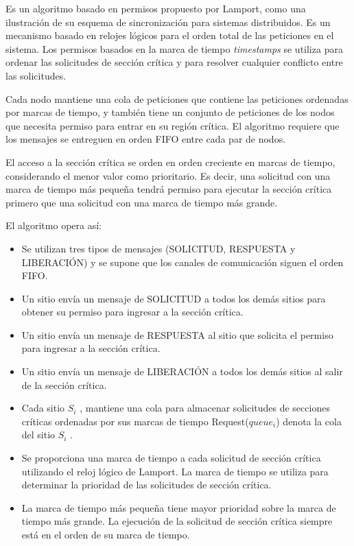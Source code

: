  
 Es un algoritmo basado en permisos propuesto por Lamport, \cite{Lamport1978} como una ilustración de su esquema de sincronización para sistemas distribuidos. Es un  mecanismo basado en relojes lógicos para el orden  total de las peticiones en el sistema.
 Los permisos basados en la marca de tiempo \textit{timestamps} se utiliza para ordenar las solicitudes de sección crítica y para resolver cualquier conflicto entre las solicitudes.
 
 Cada nodo  mantiene una cola de peticiones que contiene las
 peticiones ordenadas por marcas de tiempo, y
 también tiene un conjunto de peticiones de los nodos
 que necesita permiso para entrar en su región crítica.
 El algoritmo requiere que los mensajes se entreguen
 en orden FIFO entre cada par de nodos.   	
	
El acceso a la secci\'on cr\'itica se orden en orden creciente en marcas de tiempo, considerando el menor valor como prioritario.
Es decir, una solicitud con una marca de tiempo más pequeña tendrá permiso para ejecutar la sección crítica 	primero que una solicitud con una marca 	de tiempo más grande.
 
El algoritmo  opera as\'i:  
	\begin{itemize} 
		\item Se utilizan tres tipos de mensajes (SOLICITUD,
		RESPUESTA y LIBERACIÓN) y se supone que los
		canales de comunicación siguen el orden FIFO.
		\item Un sitio envía un mensaje de SOLICITUD a todos los
		demás sitios para obtener su permiso para ingresar a
		la sección crítica.
		\item Un sitio envía un mensaje de RESPUESTA al sitio que
		solicita el permiso para ingresar a la sección crítica.
		\item Un sitio envía un mensaje de LIBERACIÓN a todos los
		demás sitios al salir de la sección crítica.

		\item Cada sitio $S_{i}$ , mantiene una cola para almacenar
		solicitudes de secciones críticas ordenadas por sus
		marcas de tiempo Request($queue_{i}$) denota la cola del sitio 	$S_{i}$ .
		\item Se proporciona una marca de tiempo a cada solicitud de 	sección crítica utilizando el reloj lógico de Lamport. La marca de tiempo se utiliza para determinar la
		prioridad de las solicitudes de sección crítica. 
		\item La marca de tiempo más pequeña tiene mayor prioridad sobre la 	marca de tiempo más grande. La ejecución de la solicitud de sección crítica siempre está en el orden de su marca de tiempo.
	\end{itemize}
 
